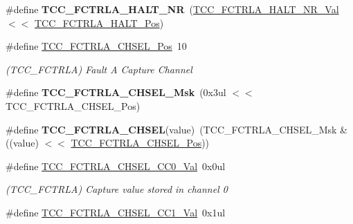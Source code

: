 \begin{DoxyCompactItemize}
\item 
\hypertarget{group___s_a_m_l21___t_c_c_ga403e7ef3e0e9297628a8f0d642d28899}{}\#define {\bfseries T\+C\+C\+\_\+\+F\+C\+T\+R\+L\+A\+\_\+\+H\+A\+L\+T\+\_\+\+N\+R}~(\hyperlink{group___s_a_m_l21___t_c_c_gaf7cb8b989556f89d502c134fa50b5c08}{T\+C\+C\+\_\+\+F\+C\+T\+R\+L\+A\+\_\+\+H\+A\+L\+T\+\_\+\+N\+R\+\_\+\+Val}        $<$$<$ \hyperlink{group___s_a_m_l21___t_c_c_ga8057b61f673517b6a99ea43d1942b094}{T\+C\+C\+\_\+\+F\+C\+T\+R\+L\+A\+\_\+\+H\+A\+L\+T\+\_\+\+Pos})\label{group___s_a_m_l21___t_c_c_ga403e7ef3e0e9297628a8f0d642d28899}

\item 
\hypertarget{group___s_a_m_l21___t_c_c_gaf5d2e7e2fb26fa98fd5d1b9c2bd67caa}{}\#define \hyperlink{group___s_a_m_l21___t_c_c_gaf5d2e7e2fb26fa98fd5d1b9c2bd67caa}{T\+C\+C\+\_\+\+F\+C\+T\+R\+L\+A\+\_\+\+C\+H\+S\+E\+L\+\_\+\+Pos}~10\label{group___s_a_m_l21___t_c_c_gaf5d2e7e2fb26fa98fd5d1b9c2bd67caa}

\begin{DoxyCompactList}\small\item\em (T\+C\+C\+\_\+\+F\+C\+T\+R\+L\+A) Fault A Capture Channel \end{DoxyCompactList}\item 
\hypertarget{group___s_a_m_l21___t_c_c_ga5ee0192f40db6780e2e6f33469734dea}{}\#define {\bfseries T\+C\+C\+\_\+\+F\+C\+T\+R\+L\+A\+\_\+\+C\+H\+S\+E\+L\+\_\+\+Msk}~(0x3ul $<$$<$ T\+C\+C\+\_\+\+F\+C\+T\+R\+L\+A\+\_\+\+C\+H\+S\+E\+L\+\_\+\+Pos)\label{group___s_a_m_l21___t_c_c_ga5ee0192f40db6780e2e6f33469734dea}

\item 
\hypertarget{group___s_a_m_l21___t_c_c_ga89c9e3e33df9e517add5647a887bc84d}{}\#define {\bfseries T\+C\+C\+\_\+\+F\+C\+T\+R\+L\+A\+\_\+\+C\+H\+S\+E\+L}(value)~(T\+C\+C\+\_\+\+F\+C\+T\+R\+L\+A\+\_\+\+C\+H\+S\+E\+L\+\_\+\+Msk \& ((value) $<$$<$ \hyperlink{group___s_a_m_l21___t_c_c_gaf5d2e7e2fb26fa98fd5d1b9c2bd67caa}{T\+C\+C\+\_\+\+F\+C\+T\+R\+L\+A\+\_\+\+C\+H\+S\+E\+L\+\_\+\+Pos}))\label{group___s_a_m_l21___t_c_c_ga89c9e3e33df9e517add5647a887bc84d}

\item 
\hypertarget{group___s_a_m_l21___t_c_c_ga3c20935faff4c001a1c082b4d3200c82}{}\#define \hyperlink{group___s_a_m_l21___t_c_c_ga3c20935faff4c001a1c082b4d3200c82}{T\+C\+C\+\_\+\+F\+C\+T\+R\+L\+A\+\_\+\+C\+H\+S\+E\+L\+\_\+\+C\+C0\+\_\+\+Val}~0x0ul\label{group___s_a_m_l21___t_c_c_ga3c20935faff4c001a1c082b4d3200c82}

\begin{DoxyCompactList}\small\item\em (T\+C\+C\+\_\+\+F\+C\+T\+R\+L\+A) Capture value stored in channel 0 \end{DoxyCompactList}\item 
\hypertarget{group___s_a_m_l21___t_c_c_ga632df96067bbd5baef5799cc2b89b3d1}{}\#define \hyperlink{group___s_a_m_l21___t_c_c_ga632df96067bbd5baef5799cc2b89b3d1}{T\+C\+C\+\_\+\+F\+C\+T\+R\+L\+A\+\_\+\+C\+H\+S\+E\+L\+\_\+\+C\+C1\+\_\+\+Val}~0x1ul\label{group___s_a_m_l21___t_c_c_ga632df96067bbd5baef5799cc2b89b3d1}


\end{DoxyCompactItemize}
